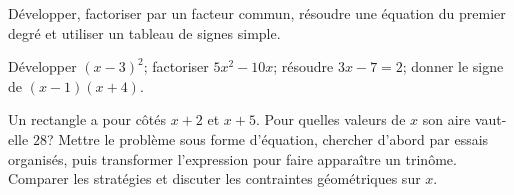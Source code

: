 \begin{prerequis}
Développer, factoriser par un facteur commun, résoudre une équation du premier
degré et utiliser un tableau de signes simple.
\end{prerequis}
\begin{automatismes}
Développer $(x-3)^2$; factoriser $5x^2-10x$; résoudre $3x-7=2$;
donner le signe de $(x-1)(x+4)$.
\end{automatismes}
\begin{activite}
Un rectangle a pour côtés $x+2$ et $x+5$. Pour quelles valeurs de $x$ son aire
vaut-elle $28$? Mettre le problème sous forme d'équation, chercher d'abord par
essais organisés, puis transformer l'expression pour faire apparaître un trinôme.
Comparer les stratégies et discuter les contraintes géométriques sur $x$.
\end{activite}

